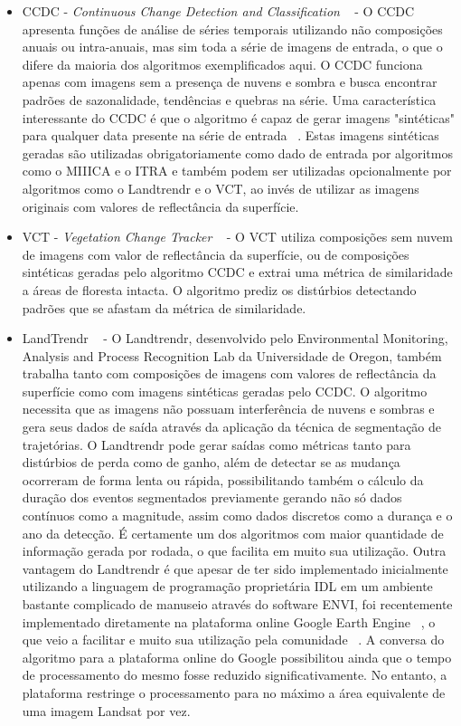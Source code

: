 \documentclass[twocolumn]{article}
\begin{document}
\begin{itemize}
  \item CCDC - \textit{Continuous Change Detection and Classification} ~\cite{ZHU2014152} - O CCDC apresenta funções de análise de séries temporais utilizando não composições anuais ou intra-anuais, mas sim toda a série de imagens de entrada, o que o difere da maioria dos algoritmos exemplificados aqui. O CCDC funciona apenas com imagens sem a presença de nuvens e sombra e busca encontrar padrões de sazonalidade, tendências e quebras na série. Uma característica interessante do CCDC é que o algoritmo é capaz de gerar imagens "sintéticas" para qualquer data presente na série de entrada ~\cite{ZHU201567}. Estas imagens sintéticas geradas são utilizadas obrigatoriamente como dado de entrada por algoritmos como o MIIICA e o ITRA e também podem ser utilizadas opcionalmente por algoritmos como o Landtrendr e o VCT, ao invés de utilizar as imagens originais com valores de reflectância da superfície.
  
  \item VCT - \textit{Vegetation Change Tracker} ~\cite{Huang2010, THOMAS201119} - O VCT utiliza composições sem nuvem de imagens com valor de reflectância da superfície, ou de composições sintéticas geradas pelo algoritmo CCDC e extrai uma métrica de similaridade a áreas de floresta intacta. O algoritmo prediz os distúrbios detectando padrões que se afastam da métrica de similaridade. 
  
  \item LandTrendr ~\cite{KENNEDY20102897, KENNEDY2012117} - O Landtrendr, desenvolvido pelo Environmental Monitoring, Analysis and Process Recognition Lab da Universidade de Oregon, também trabalha tanto com composições de imagens com valores de reflectância da superfície como com imagens sintéticas geradas pelo CCDC. O algoritmo necessita que as imagens não possuam interferência de nuvens e sombras e gera seus dados de saída através da aplicação da técnica de segmentação de trajetórias. O Landtrendr pode gerar saídas como métricas tanto para distúrbios de perda como de ganho, além de detectar se as mudança ocorreram de forma lenta ou rápida, possibilitando também o cálculo da duração dos eventos segmentados previamente gerando não só dados contínuos como a magnitude, assim como dados discretos como a durança e o ano da detecção. É certamente um dos algoritmos com maior quantidade de informação gerada por rodada, o que facilita em muito sua utilização. Outra vantagem do Landtrendr é que apesar de ter sido implementado inicialmente utilizando a linguagem de programação proprietária IDL em um ambiente bastante complicado de manuseio através do software ENVI, foi recentemente implementado diretamente na plataforma online Google Earth Engine ~\cite{GORELICK201718}, o que veio a facilitar e muito sua utilização pela comunidade ~\cite{Kennedy2018}. A conversa do algoritmo para a plataforma online do Google possibilitou ainda que o tempo de processamento do mesmo fosse reduzido significativamente. No entanto, a plataforma restringe o processamento para no máximo a área equivalente de uma imagem Landsat por vez.
  

\end{itemize}
\end{document}
